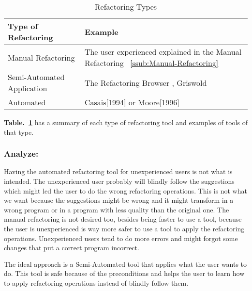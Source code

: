 


\begin{table}[h]
\caption{Refactoring Types}
\label{tab-Refactoring-Types}
\begin{tabular}{|l|l|}
\hline
\textbf{Type of Refactoring} & \textbf{Example}                                                                             \\ \hline
Manual Refactoring           & The user experienced explained in the Manual Refactoring ~\ref{ssub:Manual-Refactoring}      \\ \hline
Semi-Automated Application   & The Refactoring Browser \cite{roberts1997refactoring}, Griswold \cite{griswold1993automated} \\ \hline
Automated                    & Casais[1994] \cite{casais1994automatic} or Moore[1996] \cite{moore1996automatic}             \\ \hline
\end{tabular}
\end{table}



{\bf Table.~\ref{tab-Refactoring-Types}} has a summary of each type of refactoring tool and examples of tools of that type.

\subsubsection{Analyze:}
Having the automated refactoring tool for unexperienced users is not what is intended. The unexperienced user probably will blindly follow the suggestions which might led the user to do the wrong refactoring operations.
This is not what we want because the suggestions might be wrong and it might transform in a wrong program or in a program with less quality than the original one.
The manual refactoring is not desired too, besides being faster to use a tool, because the user is unexperienced is way more safer to use a tool to apply the refactoring operations. 
Unexperienced users tend to do more errors and might forgot some changes that put a correct program incorrect.

The ideal approach is a Semi-Automated tool that applies what the user wants to do. 
This tool is safe because of the preconditions and helps the user to learn how to apply refactoring operations instead of blindly follow them.


